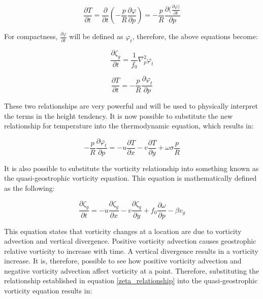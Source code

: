 \begin{equation}
    \frac{\partial T}{\partial t} = \frac{\partial}{\partial t} (- \frac{p}{R} \frac{\partial \varphi}{\partial p}) = - \frac{p}{R} \frac{\partial (\frac{\partial \varphi)}{\partial t}}{\partial p} 
\end{equation}

For compactness, $\frac{\partial \varphi}{\partial t}$ will be defined as $\varphi_t$, therefore, the above equations become:

\begin{equation}
    \frac{\partial \zeta_g}{\partial t} = \frac{1}{f_0} \nabla^{2}_p \varphi_t
    \label{zeta_relationship}
\end{equation}

\begin{equation}
    \frac{\partial T}{\partial t} = - \frac{p}{R} \frac{\partial \varphi_t}{\partial p} 
\end{equation}

These two relationships are very powerful and will be used to physically interpret the terms in the height tendency. It is now possible to substitute the new relationship for temperature into the thermodynamic equation, which results in:

\begin{equation}
    - \frac{p}{R} \frac{\partial \varphi_t}{\partial p} = -u \frac{\partial T}{\partial x} - v \frac{\partial T}{\partial y} + \omega \sigma \frac{p}{R}
\end{equation}

It is also possible to substitute the vorticity relationship into something known as the quasi-geostrophic vorticity equation. This equation is mathematically defined as the following:

\begin{equation}
    \frac{\partial \zeta_g}{\partial t} = -u \frac{\partial \zeta_g}{\partial x} - v \frac{\partial \zeta_g}{\partial y} + f_0 \frac{\partial \omega}{\partial p} - \beta v_g
\end{equation}

This equation states that vorticity changes at a location are due to vorticity advection and vertical divergence. Positive vorticity advection causes geostrophic relative vorticity to increase with time. A vertical divergence results in a vorticity increase. It is, therefore, possible to see how positive vorticity advection and negative vorticity advection affect vorticity at a point\cite{describe_quasi}. Therefore, substituting the relationship established in equation \ref{zeta_relationship} into the quasi-geostrophic vorticity equation results in:

